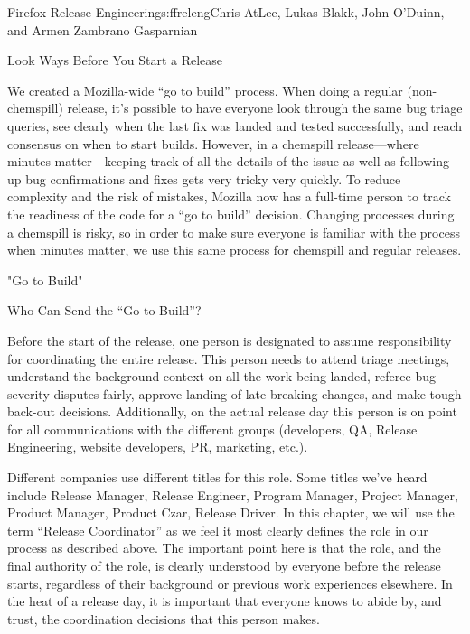 \begin{aosachapter}{Firefox Release Engineering}{s:ffreleng}{Chris AtLee, Lukas Blakk, John O'Duinn, and Armen Zambrano Gasparnian}
\begin{aosasect1}{Look  Ways Before You Start a Release}
\begin{aosaenumerate}
\item We created a Mozilla-wide ``go to build'' process. When doing a
  regular (non-chemspill) release, it's possible to have everyone look
  through the same bug triage queries, see clearly when
  the last fix was landed and tested successfully, and reach consensus on
  when to start builds. However, in a chemspill release---where
  minutes matter---keeping track of all the details of the issue as well as
  following up bug confirmations and fixes gets very tricky very
  quickly.  To reduce complexity and the risk of mistakes, Mozilla
  now has a full-time person 
  to track the readiness of the code for a ``go to build''
  decision. Changing processes
  during a chemspill is risky, so in order to make sure everyone
  is familiar with the process when minutes matter, we use this
  same process for chemspill and regular releases.

\end{aosaenumerate}


\end{aosasect1}

\begin{aosasect1}{"Go to Build"}

\begin{aosasect2}{Who Can Send the ``Go to Build''?}

Before the start of the release, one person is designated to assume
responsibility for coordinating the entire release. This person needs to 
attend triage meetings, understand the
background context on all the work being landed, referee bug severity
disputes fairly, approve landing of late-breaking changes, and make
tough back-out decisions.  Additionally, on the actual release day
this person is on point for all communications with the different
groups (developers, QA, Release Engineering, website developers, PR,
marketing, etc.).

Different companies use different titles for this role. Some titles we've heard 
include Release Manager, Release Engineer, Program Manager, Project 
Manager, Product Manager, Product Czar, Release
Driver. In this chapter, we will use the term ``Release Coordinator''
as we feel it most clearly defines the role in our process as described above. 
The important point here is that the role, and the final authority of the role, is
clearly understood by everyone before the release starts, regardless 
of their background or previous work experiences elsewhere. In the 
heat of a release day, it is important that everyone knows to abide by, and trust, 
the coordination decisions that this person makes. 


\end{aosasect2}
\end{aosasect1}
\end{aosachapter}
